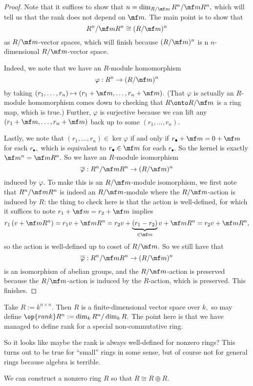 \begin{proof}
	Note that it suffices to show that $n=\dim_{R/\mf m}R^n/\mf mR^n,$ which will tell us that the rank does not depend on $\mf m.$ The main point is to show that
	\[R^n/\mf mR^n\cong(R/\mf m)^n\]
	as $R/\mf m$-vector spaces, which will finish because $(R/\mf m)^n$ is n $n$-dimensional $R/\mf m$-vector space.

	Indeed, we note that we have an $R$-module homomorphism
	\[\varphi:R^n\to(R/\mf m)^n\]
	by taking $(r_1,\ldots,r_n)\mapsto(r_1+\mf m,\ldots,r_n+\mf m).$ (That $\varphi$ is actually an $R$-module homomorphism comes down to checking that $R\onto R/\mf m$ is a ring map, which is true.) Further, $\varphi$ is surjective because we can lift any $(r_1+\mf m,\ldots,r_n+\mf m)$ back up to some $(r_1,\ldots,r_n).$

	Lastly, we note that $(r_1,\ldots,r_n)\in\ker\varphi$ if and only if $r_\bullet+\mf m=0+\mf m$ for each $r_\bullet,$ which is equivalent to $r_\bullet\in\mf m$ for each $r_\bullet.$ So the kernel is exactly $\mf m^n=\mf mR^n.$ So we have an $R$-module isomorphism
	\[\overline\varphi:R^n/\mf mR^n\to(R/\mf m)^n\]
	induced by $\varphi.$ To make this is an $R/\mf m$-module isomorphism, we first note that $R^n/\mf mR^n$ is indeed an $R/\mf m$-module where the $R/\mf m$-action is induced by $R$: the thing to check here is that the action is well-defined, for which it suffices to note $r_1+\mf m=r_2+\mf m$ implies
	\[r_1\left(v+\mf mR^n\right)=r_1v+\mf mR^n=r_2v+\underbrace{(r_1-r_2)}_{\in\mf m}v+\mf mR^n=r_2v+\mf mR^n,\]
	so the action is well-defined up to coset of $R/\mf m.$ So we still have that
	\[\overline\varphi:R^n/\mf mR^n\to(R/\mf m)^n\]
	is an isomorphism of abelian groups, and the $R/\mf m$-action is preserved because the $R/\mf m$-action is induced by the $R$-action, which is preserved. This finishes.
\end{proof}
\begin{example}
	Take $R:=k^{n\times n}.$ Then $R$ is a finite-dimensional vector space over $k,$ so may define $\op{rank}R^n:=\dim_kR^n/\dim_kR.$ The point here is that we have managed to define rank for a special non-commutative ring.
\end{example}
So it looks like maybe the rank is always well-defined for nonzero rings? This turns out to be true for ``small'' rings in some sense, but of course not for general rings because algebra is terrible.
\begin{proposition}
	We can construct a nonzero ring $R$ so that $R\cong R\oplus R.$
\end{proposition}

